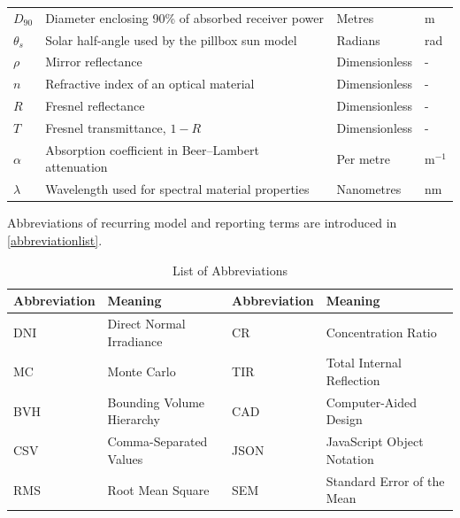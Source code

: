 \begin{table}[H]
\begin{tabular}[t]{m{}m{}m{}m{}}
$D_{90}$ & Diameter enclosing 90\% of absorbed receiver power & Metres & m \\
$\theta_s$ & Solar half-angle used by the pillbox sun model & Radians & rad \\
$\rho$ & Mirror reflectance & Dimensionless & - \\
$n$ & Refractive index of an optical material & Dimensionless & - \\
$R$ & Fresnel reflectance & Dimensionless & - \\
$T$ & Fresnel transmittance, $1-R$ & Dimensionless & - \\
$\alpha$ & Absorption coefficient in Beer--Lambert attenuation & Per metre & m$^{-1}$ \\
$\lambda$ & Wavelength used for spectral material properties & Nanometres & nm \\
\bottomrule
\end{tabular}
\end{table}

Abbreviations of recurring model and reporting terms are introduced in
\autoref{abbreviationlist}.

\begin{table}[H]
\centering
\caption{List of Abbreviations}
\label{abbreviationlist}
\begin{tabular}[t]{m{}m{}m{}m{}}
\toprule
\textbf{Abbreviation} & \textbf{Meaning} & \textbf{Abbreviation} & \textbf{Meaning} \\
\midrule
DNI & Direct Normal Irradiance & CR & Concentration Ratio \\
MC & Monte Carlo & TIR & Total Internal Reflection \\
BVH & Bounding Volume Hierarchy & CAD & Computer-Aided Design \\
CSV & Comma-Separated Values & JSON & JavaScript Object Notation \\
RMS & Root Mean Square & SEM & Standard Error of the Mean \\
\bottomrule
\end{tabular}
\end{table}
